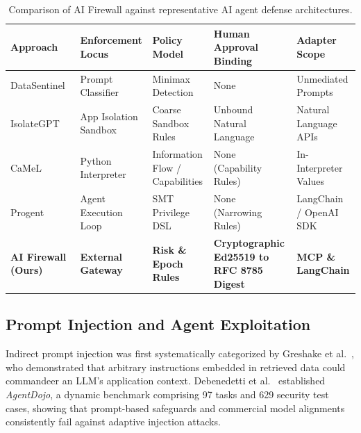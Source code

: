 \documentclass[sigconf,anonymous,review]{acmart}
\begin{document}
\begin{table}[t]
\centering
\caption{Comparison of AI Firewall against representative AI agent defense architectures.}
\label{tab:related_work}
\small
\begin{tabular}{lllll}
\toprule
\textbf{Approach} & \textbf{Enforcement Locus} & \textbf{Policy Model} & \textbf{Human Approval Binding} & \textbf{Adapter Scope} \\
\midrule
DataSentinel~\cite{liu2025datasentinel} & Prompt Classifier & Minimax Detection & None & Unmediated Prompts \\
IsolateGPT~\cite{wu2025isolategpt}     & App Isolation Sandbox & Coarse Sandbox Rules & Unbound Natural Language & Natural Language APIs \\
CaMeL~\cite{debenedetti2025camel}         & Python Interpreter & Information Flow / Capabilities & None (Capability Rules) & In-Interpreter Values \\
Progent~\cite{shi2025progent}             & Agent Execution Loop & SMT Privilege DSL & None (Narrowing Rules) & LangChain / OpenAI SDK \\
\textbf{AI Firewall (Ours)}               & \textbf{External Gateway} & \textbf{Risk \& Epoch Rules} & \textbf{Cryptographic Ed25519 to RFC 8785 Digest} & \textbf{MCP \& LangChain} \\
\bottomrule
\end{tabular}
\end{table}

\subsection{Prompt Injection and Agent Exploitation}
Indirect prompt injection was first systematically categorized by Greshake et al.~\cite{greshake2023not}, who demonstrated that arbitrary instructions embedded in retrieved data could commandeer an LLM's application context. Debenedetti et al.~\cite{debenedetti2024agentdojo} established \emph{AgentDojo}, a dynamic benchmark comprising 97 tasks and 629 security test cases, showing that prompt-based safeguards and commercial model alignments consistently fail against adaptive injection attacks.
\end{document}
